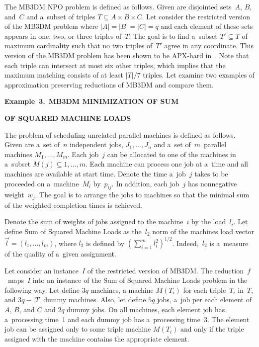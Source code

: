 \begin{multicols}{2}
\vspace*{-2pt}

\noindent
The MB3DM {NPO}
problem is defined as follows. Given are disjointed sets~$A$, $B$,
and~$C$ and a~subset of triples $T \subseteq A \times B \times C$.
Let consider the restricted version of the {MB3DM} problem where
$|A|=|B|=|C|=q$ and each element of these sets appears in one, two,
or three triples of~$T$. The goal is to find a~subset $T' \subseteq T$
of maximum cardinality such that no two triples of~$T'$ agree in any
coordinate. This version of the MB3DM problem has been shown to be
{APX}-hard in~\cite{P1994}. Note that each triple can intersect
at most six other triples, which implies that the maximum matching
consists of at least $|T|/7$ triples. Let examine two examples of
approximation preserving reductions of {MB3DM} and compare them.

\pagebreak

\noindent
\textbf{Example~3.}\ \textbf{MB3DM {}
MINIMIZATION OF SUM}

\hspace*{34pt}\textbf{OF SQUARED MACHINE
LOADS}


\smallskip

\noindent
The problem of {scheduling unrelated parallel machines} is
defined as follows. Given are a~set of~$n$ independent jobs,
$J_1,\ldots,J_n$ and a~set of~$m$~parallel machines $M_1,\ldots,M_m$. Each
job~$j$ can be allocated to one of the machines in a~subset $M(j)
\subseteq {1,\ldots ,m}$. Each machine can process one job at a~time
and all machines are available at start time. Denote the time a~job~$j$ takes to be proceeded on a~machine~$M_i$ by~$p_{ij}$. In
addition, each job~$j$ has nonnegative weight~$w_j$. The goal is to
arrange the jobs to machines so that the minimal sum of the weighted
completion times is achieved.

Denote the sum of weights of jobs assigned to the machine~$i$ by the
load~$l_i$. Let define {Sum of Squared Machine Loads} as the~$l_2$
norm of the machines load vector
$\overrightarrow{l}=(l_1,\ldots,l_m)$, where $l_2$ is defined by
$(\sum\limits_{i=1}^{m}l_i^2)^{1/2}$. Indeed,~$l_2$ is a~measure of the
quality of a~given assignment.

Let consider an instance~$I$ of the restricted version of MB3DM.
The reduction~$f$~maps~$I$ into an instance of the Sum of Squared
Machine Loads problem in the following way. Let define $3q$ machines,
a machine $M(T_i)$ for each triple~$T_i$ in~$T$, and $3q-|T|$ dummy
machines. Also, let define $5q$ jobs, a~job per each element of~$A$,
$B$, and $C$ and $2q$ dummy jobs. On all machines, each element job
has a~processing time~1 and each dummy job has a~processing time~3.
The element job can be assigned only to some triple machine
$M(T_i)$ and only if the triple assigned with the machine contains
the appropriate element.


\end{multicols}
